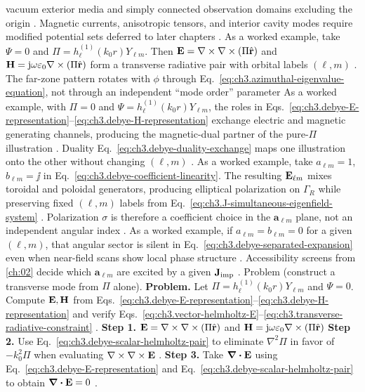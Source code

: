 vacuum exterior media and simply connected observation domains excluding the origin . Magnetic
currents, anisotropic tensors, and interior cavity modes require modified potential sets deferred to later
chapters .
As a worked example, take \(\Psi=0\) and \(\Pi=h_{\ell}^{(1)}(k_{0}r)Y_{\ell m}\). Then \(\mathbf{E}=\nabla\times\nabla\times(\Pi\hat{\mathbf{r}})\) and
\(\mathbf{H}=\mathrm{j}\omega\varepsilon_{0}\nabla\times(\Pi\hat{\mathbf{r}})\) form a transverse radiative pair with orbital labels
\((\ell,m)\) . The far-zone pattern rotates with \(\phi\) through
Eq.~\eqref{eq:ch3.azimuthal-eigenvalue-equation}, not through an independent ``mode order'' parameter
As a worked example, with \(\Pi=0\) and \(\Psi=h_{\ell}^{(1)}(k_{0}r)Y_{\ell m}\), the roles in
Eqs.~\eqref{eq:ch3.debye-E-representation}--\eqref{eq:ch3.debye-H-representation} exchange electric and
magnetic generating channels, producing the magnetic-dual partner of the pure-\(\Pi\) illustration
. Duality Eq.~\eqref{eq:ch3.debye-duality-exchange} maps one illustration onto the
other without changing \((\ell,m)\) .
As a worked example, take \(a_{\ell m}=1\), \(b_{\ell m}=\jj\) in Eq.~\eqref{eq:ch3.debye-coefficient-linearity}. The resulting
\(\mathbf{E}_{\ell m}\) mixes toroidal and poloidal generators, producing elliptical polarization on \(\Gamma_R\) while
preserving fixed \((\ell,m)\) labels from Eq.~\eqref{eq:ch3.J-simultaneous-eigenfield-system}
. Polarization \(\sigma\) is therefore a coefficient choice in the
\(\mathbf{a}_{\ell m}\) plane, not an independent angular index .
As a worked example, if \(a_{\ell m}=b_{\ell m}=0\) for a given \((\ell,m)\), that angular sector is silent in
Eq.~\eqref{eq:ch3.debye-separated-expansion} even when near-field scans show local phase structure
. Accessibility screens from \ref{ch:02} decide which \(\mathbf{a}_{\ell m}\) are
excited by a given \(\mathbf{J}_{\mathrm{imp}}\) .
Problem (construct a transverse mode from \(\Pi\) alone). \textbf{Problem.} Let \(\Pi=h_{\ell}^{(1)}(k_{0}r)Y_{\ell m}\) and \(\Psi=0\). Compute \(\mathbf{E},\mathbf{H}\) from
Eqs.~\eqref{eq:ch3.debye-E-representation}--\eqref{eq:ch3.debye-H-representation} and verify
Eqs.~\eqref{eq:ch3.vector-helmholtz-E}--\eqref{eq:ch3.transverse-radiative-constraint} .
\textbf{Step 1.} \(\mathbf{E}=\nabla\times\nabla\times(\Pi\hat{\mathbf{r}})\) and \(\mathbf{H}=\mathrm{j}\omega\varepsilon_{0}\nabla\times(\Pi\hat{\mathbf{r}})\)
\textbf{Step 2.} Use Eq.~\eqref{eq:ch3.debye-scalar-helmholtz-pair} to eliminate \(\nabla^{2}\Pi\) in favor of
\(-k_{0}^{2}\Pi\) when evaluating \(\nabla\times\nabla\times\mathbf{E}\) .
\textbf{Step 3.} Take \(\div\mathbf{E}\) using Eq.~\eqref{eq:ch3.debye-E-representation} and
Eq.~\eqref{eq:ch3.debye-scalar-helmholtz-pair} to obtain \(\div\mathbf{E}=0\) .
